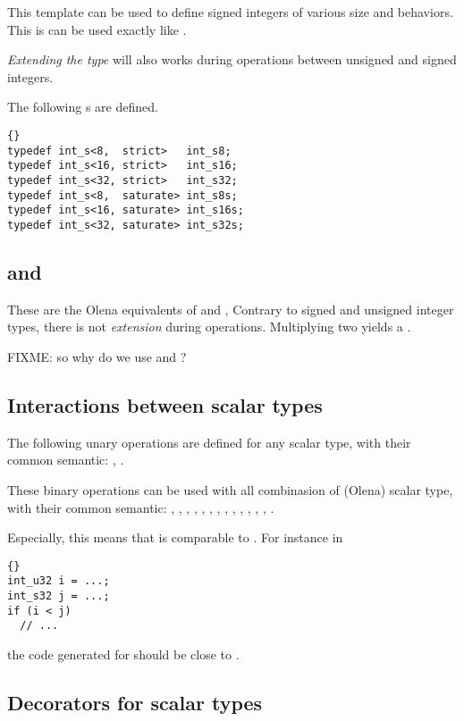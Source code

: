 This template can be used to define signed integers of various size
and behaviors.  This is can be used exactly like
.

\emph{Extending the type} will also works during operations between
unsigned and signed integers.

The following s are defined.
\begin{lstlisting}{}
typedef int_s<8,  strict>	int_s8;
typedef int_s<16, strict>	int_s16;
typedef int_s<32, strict>	int_s32;
typedef int_s<8,  saturate>	int_s8s;
typedef int_s<16, saturate>	int_s16s;
typedef int_s<32, saturate>	int_s32s;
\end{lstlisting}

\subsection{ and }

These are the Olena equivalents of  and ,
Contrary to signed and unsigned integer types, there is not
\emph{extension} during operations.  Multiplying two 
yields a .

FIXME: so why do we use  and ?

\subsection{Interactions between scalar types}

The following unary operations are defined for any scalar type, with
their common semantic:
, .

These binary operations can be used with all combinasion of (Olena)
scalar type, with their common semantic: , ,
, , , , ,
, , , , , , .

Especially, this means that  is comparable to
.  For instance in
\begin{lstlisting}{}
int_u32 i = ...;
int_s32 j = ...;
if (i < j)
  // ...
\end{lstlisting}
the code generated for  should be close to
.

\subsection{Decorators for scalar types}

